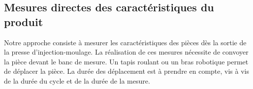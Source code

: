 \subsection{Mesures directes des caractéristiques du produit}
%
%
%
%
%
%
%
Notre approche consiste à mesurer les caractéristiques des pièces dès la sortie de la presse d'injection-moulage.
La réalisation de ces mesures nécessite de convoyer la pièce devant le banc de mesure.
Un tapis roulant ou un bras robotique permet de déplacer la pièce.
La durée des déplacement est à prendre en compte, vis à vis de la durée du cycle et de la durée de la mesure.

